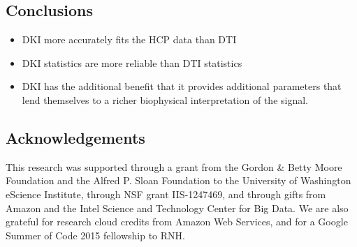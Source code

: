 \documentclass[a0, landscape]{a0poster}
\begin{document}
\begin{multicols}{3}

\color{SaddleBrown} %

\section*{Conclusions}
\large
\begin{itemize}

\item DKI more accurately fits the HCP data than DTI

\item DKI statistics are more reliable than DTI statistics

\item DKI has the additional benefit that it provides additional parameters that
lend themselves to a richer biophysical interpretation of the signal.

\end{itemize}

\color{DarkSlateGray} %


\nocite{*} %
\footnotesize  %

\subsection*{Acknowledgements} \footnotesize This research was supported through
a grant from the Gordon \& Betty Moore Foundation and the Alfred P. Sloan
Foundation to the University of Washington eScience Institute, through NSF grant
IIS-1247469, and through gifts from Amazon and the Intel Science and Technology
Center for Big Data. We are also grateful for research cloud credits from Amazon
Web Services, and for a Google Summer of Code 2015 fellowship to RNH.


\end{multicols}
\end{document}
